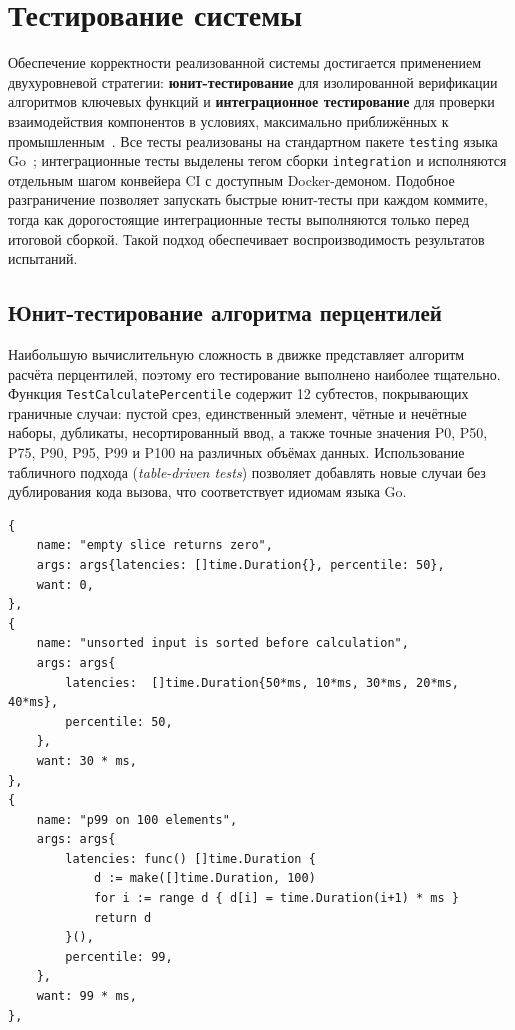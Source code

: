 \section{Тестирование системы}

Обеспечение корректности реализованной системы достигается применением двухуровневой стратегии: \textbf{юнит-тестирование} для изолированной верификации алгоритмов ключевых функций и \textbf{интеграционное тестирование} для проверки взаимодействия компонентов в условиях, максимально приближённых к промышленным~\cite[с.~77]{kulikov2020}.
Все тесты реализованы на стандартном пакете \texttt{testing} языка Go~\cite{gospec}; интеграционные тесты выделены тегом сборки \texttt{integration} и исполняются отдельным шагом конвейера CI с доступным Docker-демоном.
Подобное разграничение позволяет запускать быстрые юнит-тесты при каждом коммите, тогда как дорогостоящие интеграционные тесты выполняются только перед итоговой сборкой.
Такой подход обеспечивает воспроизводимость результатов испытаний.

\subsection*{Юнит-тестирование алгоритма перцентилей}

Наибольшую вычислительную сложность в движке представляет алгоритм расчёта перцентилей, поэтому его тестирование выполнено наиболее тщательно.
Функция \texttt{TestCalculatePercentile} содержит 12 субтестов, покрывающих граничные случаи: пустой срез, единственный элемент, чётные и нечётные наборы, дубликаты, несортированный ввод, а также точные значения P0, P50, P75, P90, P95, P99 и P100 на различных объёмах данных.
Использование табличного подхода (\textit{table-driven tests}) позволяет добавлять новые случаи без дублирования кода вызова, что соответствует идиомам языка Go.

\begin{lstlisting}[caption={Фрагмент юнит-теста \texttt{TestCalculatePercentile}},label={lst:unittest}]
{
    name: "empty slice returns zero",
    args: args{latencies: []time.Duration{}, percentile: 50},
    want: 0,
},
{
    name: "unsorted input is sorted before calculation",
    args: args{
        latencies:  []time.Duration{50*ms, 10*ms, 30*ms, 20*ms, 40*ms},
        percentile: 50,
    },
    want: 30 * ms,
},
{
    name: "p99 on 100 elements",
    args: args{
        latencies: func() []time.Duration {
            d := make([]time.Duration, 100)
            for i := range d { d[i] = time.Duration(i+1) * ms }
            return d
        }(),
        percentile: 99,
    },
    want: 99 * ms,
},
\end{lstlisting}

